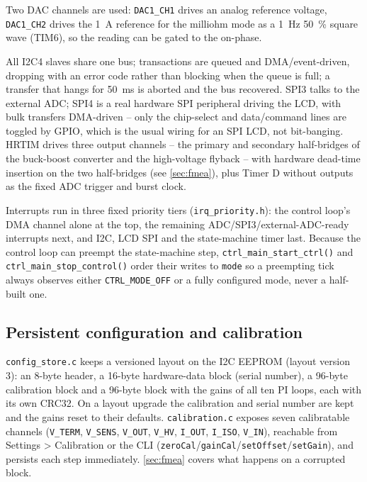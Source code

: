 Two \ac{DAC} channels are used: \texttt{DAC1\_CH1} drives an analog
reference voltage, \texttt{DAC1\_CH2} drives the \qty{1}{\ampere} reference
for the milliohm mode as a \qty{1}{\hertz} \qty{50}{\percent} square wave
(TIM6), so the reading can be gated to the on-phase.

All \ac{I2C}4 slaves share one bus; transactions are queued and
\ac{DMA}/event-driven, dropping with an error code rather than blocking
when the queue is full; a transfer that hangs for \qty{50}{\milli\second} is
aborted and the bus recovered. \ac{SPI}3 talks to the external \ac{ADC}; \ac{SPI}4
is a real hardware \ac{SPI} peripheral driving the \ac{LCD}, with bulk
transfers \ac{DMA}-driven -- only the chip-select and data/command lines
are toggled by \ac{GPIO}, which is the usual wiring for an \ac{SPI} \ac{LCD},
not bit-banging. \ac{HRTIM}
drives three output channels -- the primary and secondary half-bridges of
the buck-boost converter and the high-voltage flyback -- with hardware
dead-time insertion on the two half-bridges (see \autoref{sec:fmea}), plus
Timer D without outputs as the fixed \ac{ADC} trigger and burst clock.

Interrupts run in three fixed priority tiers (\texttt{irq\_priority.h}):
the control loop's \ac{DMA} channel alone at the top, the remaining
\ac{ADC}/\ac{SPI}3/external-\ac{ADC}-ready interrupts next, and \ac{I2C},
\ac{LCD} \ac{SPI} and the state-machine timer last. Because the control
loop can preempt the state-machine step, \texttt{ctrl\_main\_start\_ctrl()}
and \texttt{ctrl\_main\_stop\_control()} order their writes to \texttt{mode}
so a preempting tick always observes either \texttt{CTRL\_MODE\_OFF} or a
fully configured mode, never a half-built one.

\subsection{Persistent configuration and calibration}

\texttt{config\_store.c} keeps a versioned layout on the \ac{I2C}
\ac{EEPROM} (layout version 3): an 8-byte header, a 16-byte hardware-data
block (serial number), a 96-byte calibration block and a 96-byte block with
the gains of all ten PI loops, each with its own \ac{CRC}32. On a layout
upgrade the calibration and serial number are kept and the gains reset to
their defaults. \texttt{calibration.c} exposes seven calibratable channels
(\texttt{V\_TERM}, \texttt{V\_SENS}, \texttt{V\_OUT}, \texttt{V\_HV},
\texttt{I\_OUT}, \texttt{I\_ISO}, \texttt{V\_IN}), reachable from Settings > Calibration or the \ac{CLI}
(\texttt{zeroCal}/\texttt{gainCal}/\texttt{setOffset}/\texttt{setGain}), and
persists each step immediately. \autoref{sec:fmea} covers what happens on a
corrupted block.

